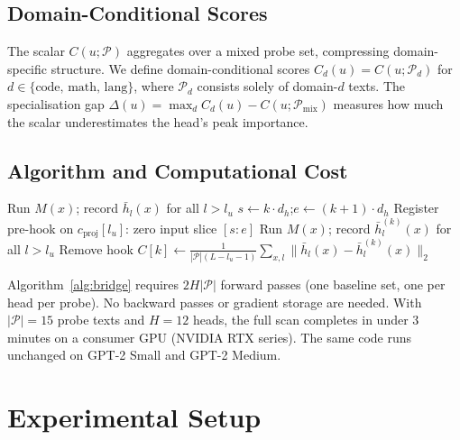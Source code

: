 \documentclass[11pt,a4paper]{article}
\newcommand{\hb}{\bar{h}}
\theoremstyle{definition}
\theoremstyle{plain}
\begin{document}
\subsection{Domain-Conditional Scores}
\label{sec:domain_def}

The scalar $C(u;\mathcal{P})$ aggregates over a mixed probe set, compressing
domain-specific structure.
We define domain-conditional scores $C_d(u) = C(u;\mathcal{P}_d)$ for
$d \in \{\text{code, math, lang}\}$, where $\mathcal{P}_d$ consists solely
of domain-$d$ texts.
The specialisation gap $\Delta(u) = \max_d C_d(u) - C(u;\mathcal{P}_{\text{mix}})$
measures how much the scalar underestimates the head's peak importance.

\subsection{Algorithm and Computational Cost}

\begin{algorithm}[t]
\caption{Compute $C(u;\mathcal{P})$ for all heads at layer $l_u$}
\label{alg:bridge}
\begin{algorithmic}[1]
    \State Run $M(x)$; record $\hb_l(x)$ for all $l > l_u$ 
\EndFor
{}
    \State $s \gets k \cdot d_h$;\quad $e \gets (k+1)\cdot d_h$
    \State Register pre-hook on $c_{\text{proj}}[l_u]$: zero input slice $[s:e]$
        \State Run $M(x)$; record $\hb_l^{(k)}(x)$ for all $l > l_u$
    \EndFor
    \State Remove hook
    \State $C[k] \gets \frac{1}{|\mathcal{P}|(L-l_u-1)}
              \displaystyle\sum_{x,l}\bigl\|\hb_l(x)-\hb_l^{(k)}(x)\bigr\|_2$
\EndFor
\State {}
\end{algorithmic}
\end{algorithm}

Algorithm~\ref{alg:bridge} requires $2H|\mathcal{P}|$ forward passes (one
baseline set, one per head per probe).
No backward passes or gradient storage are needed.
With $|\mathcal{P}|=15$ probe texts and $H=12$ heads, the full scan
completes in under 3 minutes on a consumer GPU (NVIDIA RTX series).
The same code runs unchanged on GPT-2 Small and GPT-2 Medium.

\section{Experimental Setup}
\label{sec:setup}
\end{document}
